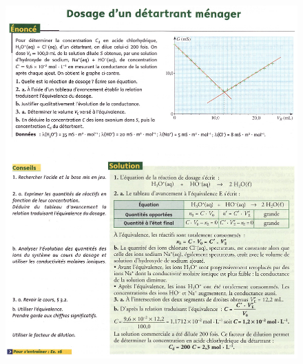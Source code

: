 \documentclass[11pt,a4paper]{article}
\begin{document}
\begin{figure}[h]
    \centering
    \includegraphics[width=\linewidth]{imgs/c1/xo4.jpg}
\end{figure} 
\end{document}
